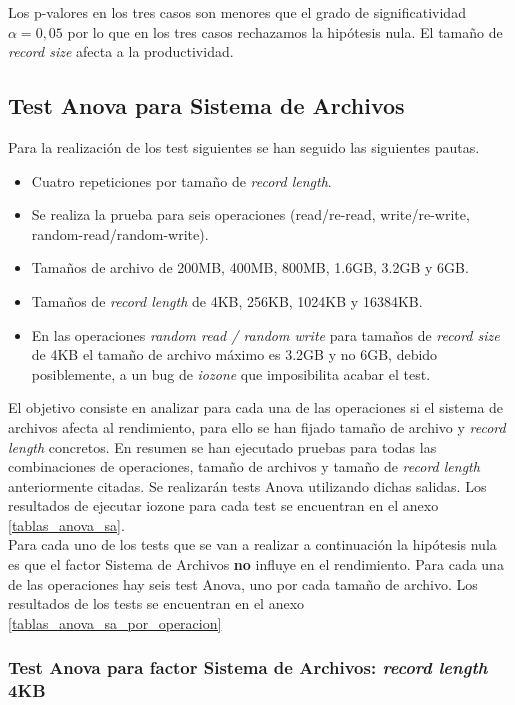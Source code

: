 Los p-valores en los tres casos son menores que el grado de significatividad $\alpha = 0,05$ por lo que en los tres casos rechazamos la hipótesis nula. El tamaño de \textit{record size} afecta a la productividad.

\subsection{Test Anova para Sistema de Archivos}
Para la realización de los test siguientes se han seguido las siguientes pautas.
\begin{itemize}
    \item Cuatro repeticiones por tamaño de \textit{record length}.
    \item Se realiza la prueba para seis operaciones (read/re-read, write/re-write, random-read/random-write).
    \item Tamaños de archivo de 200MB, 400MB, 800MB, 1.6GB, 3.2GB y 6GB.
    \item Tamaños de \textit{record length} de 4KB, 256KB, 1024KB y 16384KB.
    \item En las operaciones \textit{random read / random write} para tamaños de \textit{record size} de 4KB el tamaño de archivo máximo es 3.2GB y no 6GB, debido posiblemente, a un bug de \textit{iozone} que imposibilita acabar el test.
\end{itemize}

El objetivo consiste en analizar para cada una de las operaciones si el sistema de archivos afecta al rendimiento, para ello se han fijado tamaño de archivo y \textit{record length} concretos. En resumen se han ejecutado pruebas para todas las combinaciones de operaciones, tamaño de archivos y tamaño de \textit{record length} anteriormente citadas. Se realizarán tests Anova utilizando dichas salidas. Los resultados de ejecutar iozone para cada test se encuentran en el anexo \ref{tablas_anova_sa}.\\

Para cada uno de los tests que se van a realizar a continuación la hipótesis nula es que el factor Sistema de Archivos \textbf{no} influye en el rendimiento. Para cada una de las operaciones hay seis test Anova, uno por cada tamaño de archivo. Los resultados de los tests se encuentran en el anexo \ref{tablas_anova_sa_por_operacion}
\subsubsection{Test Anova para factor Sistema de Archivos: \textit{record length} 4KB}

